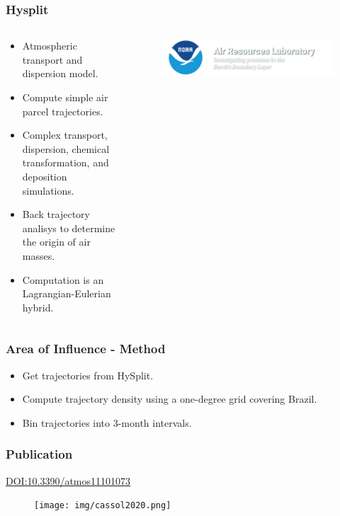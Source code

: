 \documentclass[aspectratio=169]{beamer}
\begin{document}
\begin{frame}
    \frametitle{Hysplit}
    \begin{columns}
        \begin{column}{0.5\textwidth}
            \begin{itemize}
                \item Atmospheric transport and dispersion model.
                \item Compute simple air parcel trajectories.
                \item Complex transport, dispersion, chemical transformation,
                    and deposition simulations.
                \item Back trajectory analisys to determine the origin of air 
                    masses.
                \item Computation is an Lagrangian-Eulerian hybrid.
            \end{itemize}
        \end{column}
        \begin{column}{0.5\textwidth}
            \begin{figure}
                \centering
                \includegraphics[scale=0.15]
                {logos/noaa_air_resources_laboratory.png}
            \end{figure}
        \end{column}
    \end{columns}
\end{frame}

\begin{frame}
    \frametitle{Area of Influence - Method}
    \begin{itemize}
        \item Get trajectories from HySplit.
        \item Compute trajectory density using a one-degree grid covering 
            Brazil.
        \item Bin trajectories into 3-month intervals.
    \end{itemize}
\end{frame}

\begin{frame}
    \frametitle{Publication}
    \href{https://www.mdpi.com/2073-4433/11/10/1073}
    {DOI:10.3390/atmos11101073}~\cite{cassol2020}
    \begin{figure}
        \centering
        \texttt{[image: img/cassol2020.png]}
    \end{figure}
\end{frame}
\end{document}

